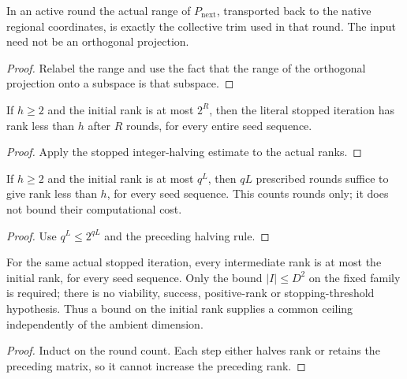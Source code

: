 \begin{lemma}
    \label{lem:canonical_half_sampling_active_range}
    \leanok
    In an active round the actual range of $P_{\mathrm{next}}$, transported
    back to the native regional coordinates, is exactly the collective
    trim used in that round. The input need not be an orthogonal projection.
\end{lemma}
\begin{proof}\leanok
    Relabel the range and use the fact that the range of the orthogonal
    projection onto a subspace is that subspace.
\end{proof}

\begin{lemma}
    \label{lem:canonical_half_sampling_rank_stops}
    \leanok
    If $h\ge2$ and the initial rank is at most $2^R$, then the literal
    stopped iteration has rank less than $h$ after $R$ rounds, for every
    entire seed sequence.
\end{lemma}
\begin{proof}\leanok
    Apply the stopped integer-halving estimate to the actual ranks.
\end{proof}

\begin{lemma}
    \label{lem:canonical_half_sampling_chain_rank_stops}
    \leanok
    If $h\ge2$ and the initial rank is at most $q^L$, then $qL$ prescribed
    rounds suffice to give rank less than $h$, for every seed sequence.
    This counts rounds only; it does not bound their computational cost.
\end{lemma}
\begin{proof}\leanok
    Use $q^L\le2^{qL}$ and the preceding halving rule.
\end{proof}

\begin{lemma}
    \label{lem:canonical_half_sampling_initial_rank_ceiling}
    \leanok
    For the same actual stopped iteration, every intermediate rank is at
    most the initial rank, for every seed sequence. Only the bound
    $|I|\le D^2$ on the fixed family is required; there is no viability,
    success, positive-rank or stopping-threshold hypothesis. Thus a bound
    on the initial rank supplies a common ceiling independently of the
    ambient dimension.
\end{lemma}
\begin{proof}\leanok
    Induct on the round count. Each step either halves rank or retains the
    preceding matrix, so it cannot increase the preceding rank.
\end{proof}
